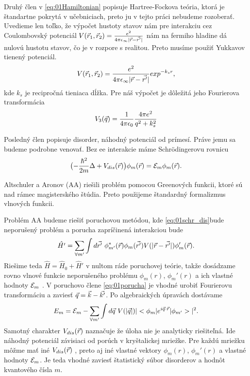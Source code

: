 Druhý člen v \eqref{eq:01Hamiltonian}  popisuje Hartree-Fockova teória, ktorá je štandartne pokrytá v učebniciach, preto ju v tejto práci nebudeme rozoberať.
Uvedieme len toľko, že výpočet hustoty stavov nám pre interakciu cez Coulombovský potenciál $V(\vec{r}_1, \vec{r}_2)=\frac{e^2}{4\pi \epsilon_{\infty}|\vec{r}-\vec{r'}|}$ nám na fermiho hladine dá nulovú hustotu stavov, čo je v rozpore s realitou. Preto musíme použiť Yukkavov tienený potenciál.  
\begin{equation}
\label{eq:01yukk_pot}
V(\vec{r}_1, \vec{r}_2)=\frac{e^2}{4\pi \epsilon_{\infty}|\vec{r}-\vec{r'}|}exp^{-k_sr}\text{,}
\end{equation}
kde $k_s$ je recipročná tieniaca dĺžka. Pre náš výpočet je dôležitá jeho Fourierova transformácia
\begin{equation}
\label{eq:01pot3D}
V_3(\vec{q})=\frac{1}{4\pi\epsilon_0}\frac{4\pi e^2}{q^2+k_{s}^{2} }
\end{equation}

Posledný člen popisuje disorder, náhodný potenciál od prímesí. Práve jemu sa 
budeme podrobne venovať.  Bez ee interakcie máme Schr\"odingerovu rovnicu 
\begin{equation}
\label{eq:01schr_dis}
\bigl(-\frac{\hbar^2}{2m}\Delta + V_{dis}(\vec{r})\bigr)\phi_m(\vec{r})=\mathcal{E}_m\phi_m(\vec{r}) \text{.}
\end{equation} 

Altschuler a Aronov (AA) riešili problém pomocou Greenových funkcii, ktoré sú nad rámec 
magisterského štúdia. Preto použijeme štandardný formalizmus vlnových funkcii.

Problém AA budeme riešiť poruchovou metódou, kde \eqref{eq:01schr_dis}bude 
neporušený problém a porucha zapríčinená interakciou bude 
\begin{equation}
 \label{eq:01porucha}
 \hat{H'}=\sum_{\forall m'} \int d\vrp \ \phi^*_{m'}(\vr)\phi_{m}(\vrp)V(|\vr-\vrp|)
 \phi_m'(\vr) \text{.}
\end{equation} 
Riešime teda $\hat H=\hat H_0+\hat H'$ v nultom ráde poruchovej teórie, takže dosádzame rovno vlnové funkcie neporušeného problému $\phi_m(r)$, $\phi_m'(r)$ a ich vlastné hodnoty $\mathcal{E}_m$ .  V poruchovo člene \eqref{eq:01porucha} je vhodné urobiť Fourierovu transformáciu a zaviesť $\vec{q}=\vec{k}-\vec{k'}$. Po algebraických úpravách dostávame
\begin{equation}
\label{eq:erg_V_ft} 
 E_m=\mathcal{E}_m-\sum_{\forall m'} \int d\vec{q}\ V(|\vec{q}|) |<\phi_m|e^{i\vec{q}\cdot\vec{r}}|\phi_{m'}>|^2 \text{.}
\end{equation} 
Samotný charakter $V_{dis}(\vec{r})$ naznačuje že úloha nie je analyticky riešiteľná. Ide
náhodný potenciál závisiaci od porúch v kryštalickej mriežke. Pre každú mriežku môžme 
mať  iné $V_{dis}(\vec{r})$ 
, preto aj iné vlastné vektory $\phi_m(r)$, $\phi_m'(r)$ a vlastné hodnoty $\mathcal{E}_m$. Je teda 
vhodné zaviesť 
štatistický súbor disorderov a hodnôt kvantového čísla $m$.

